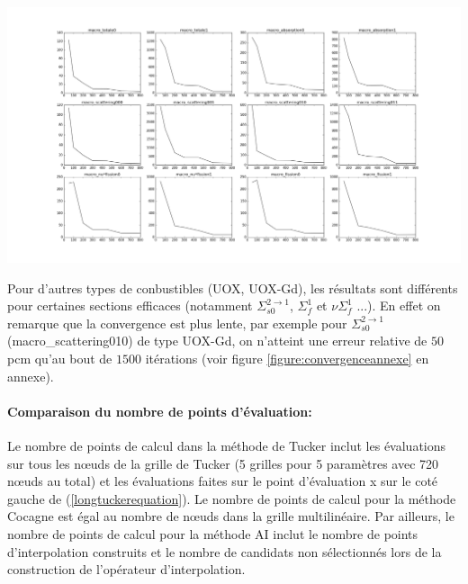 \begin{center}
\includegraphics[height= 9 cm,width = \linewidth]{images/MOX/Convergence_speed_without_adaptivity.png}
\label{figure:convergencespeedplus}
\end{center}

Pour d'autres types de conbustibles (UOX, UOX-Gd), les résultats sont différents pour certaines sections efficaces (notamment $\Sigma_{s0}^{2\rightarrow1}$, $\Sigma_f^1$ et $\nu\Sigma_f^1$ ...). En effet on remarque que la convergence est plus lente, par exemple pour $\Sigma_{s0}^{2\rightarrow1}$ (macro\_scattering010) de type UOX-Gd, on n'atteint une erreur relative de $50$ pcm qu'au bout de $1500$ itérations (voir figure \ref{figure:convergenceannexe} en annexe).

\paragraph{Comparaison du nombre de points d'évaluation:\\}
\hspace{0.5cm} Le nombre de points de calcul dans la méthode de Tucker inclut les évaluations sur tous les nœuds de la grille de Tucker (5 grilles pour 5 paramètres avec 720 nœuds au total) et les évaluations faites sur le point d'évaluation x sur le coté gauche de (\ref{longtuckerequation}). Le nombre de points de calcul pour la méthode Cocagne est égal au nombre de nœuds dans la grille multilinéaire. Par ailleurs, le nombre de points de calcul pour la méthode AI inclut le nombre de points d'interpolation construits et le nombre de candidats non sélectionnés lors de la construction de l'opérateur d'interpolation.\\

